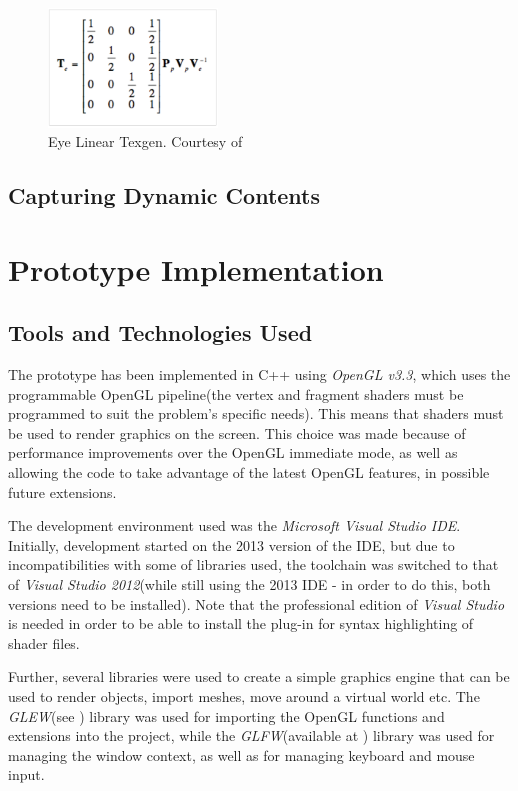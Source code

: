 \documentclass[]{article}
\begin{document}
\begin{figure}[hbtp]
    \centering
    \includegraphics[width=0.4\textwidth]{figures/EyeLinearTexgen.PNG}
    \caption{Eye Linear Texgen. Courtesy of \cite{cassNvidia}}
    \label{fig:EyeLinearTexgen}
\end{figure}

\subsection{Capturing Dynamic Contents}

\section{Prototype Implementation}

\subsection{Tools and Technologies Used}

The prototype has been implemented in C++ using \textit{OpenGL v3.3}, which uses the programmable OpenGL pipeline(the vertex and fragment shaders must be programmed to suit the problem's specific needs). This means that shaders must be used to render graphics on the screen. This choice was made because of performance improvements over the OpenGL immediate mode, as well as allowing the code to take advantage of the latest OpenGL features, in possible future extensions.

The development environment used was the \textit{Microsoft Visual Studio IDE}. Initially, development started on the 2013 version of the IDE, but due to incompatibilities with some of libraries used, the toolchain was switched to that of \textit{Visual Studio 2012}(while still using the 2013 IDE - in order to do this, both versions need to be installed). Note that the professional edition of \textit{Visual Studio} is needed in order to be able to install the plug-in for syntax highlighting of shader files.

Further, several libraries were used to create a simple graphics engine that can be used to render objects, import meshes, move around a virtual world etc. The \textit{GLEW}(see \cite{glew}) library was used for importing the OpenGL functions and extensions into the project, while the \textit{GLFW}(available at \cite{glfw}) library was used for managing the window context, as well as for managing keyboard and mouse input.
\end{document}
